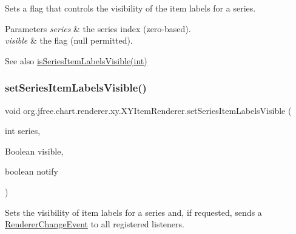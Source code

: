 Sets a flag that controls the visibility of the item labels for a series.


\begin{DoxyParams}{Parameters}
{\em series} & the series index (zero-\/based). \\
\hline
{\em visible} & the flag ({\ttfamily null} permitted).\\
\hline
\end{DoxyParams}
\begin{DoxySeeAlso}{See also}
\mbox{\hyperlink{interfaceorg_1_1jfree_1_1chart_1_1renderer_1_1xy_1_1_x_y_item_renderer_a29dbe1dc22ee0ca0c7bd5f8e55f89179}{is\+Series\+Item\+Labels\+Visible(int)}} 
\end{DoxySeeAlso}
\mbox{\label{interfaceorg_1_1jfree_1_1chart_1_1renderer_1_1xy_1_1_x_y_item_renderer_a49548687eb66f70ef866a7d8147f661e}} 
\subsubsection{\texorpdfstring{set\+Series\+Item\+Labels\+Visible()}{setSeriesItemLabelsVisible()}\hspace{0.1cm}{\footnotesize\ttfamily [3/3]}}
{\footnotesize\ttfamily void org.\+jfree.\+chart.\+renderer.\+xy.\+X\+Y\+Item\+Renderer.\+set\+Series\+Item\+Labels\+Visible (\begin{DoxyParamCaption}\item[{int}]{series,  }\item[{Boolean}]{visible,  }\item[{boolean}]{notify }\end{DoxyParamCaption})}

Sets the visibility of item labels for a series and, if requested, sends a \mbox{\hyperlink{}{Renderer\+Change\+Event}} to all registered listeners.


